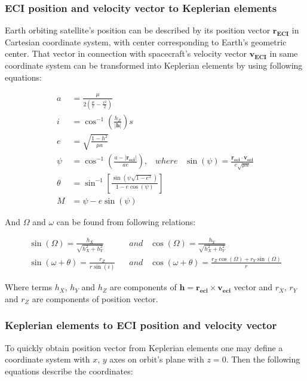     \subsubsection{ECI position and velocity vector to Keplerian elements}
        Earth orbiting satellite's position can be described by its position vector $\textbf{r}_{\textbf{ECI}}$ in Cartesian coordinate system, with center corresponding to Earth's geometric center. That vector in connection with spacecraft's velocity vector $\textbf{v}_{\textbf{ECI}}$ in same coordinate system can be transformed into Keplerian elements by using following equations:
        
        \begin{align}
            a &= \frac{\mu}{2\left(\frac{\mu}{r}-\frac{v^2}{2}\right)} \\
            i &= \cos^{-1}\left(\frac{h_Z}{|\textbf{h}|}\right)s \\
            e &= \sqrt{ \frac{1-h^2}{\mu a} } \\
            \psi &= \cos^{-1}\left(\frac{a-|\textbf{r}_{\textbf{eci}}|}{ae}\right), \;\;\; where \;\;\; \sin(\psi) = \frac{\textbf{r}_{\textbf{eci}}\cdot\textbf{v}_{\textbf{eci}}}{e\sqrt{\mu a}} \\
            \theta &= \sin^{-1}\left[\frac{\sin(\psi \sqrt{1-e^2})}{1-e\cos(\psi)}\right] \\
            M & = \psi - e\sin(\psi)
        \end{align}

        And $\Omega$ and $\omega$ can be found from following relations:

        \begin{align}
            \sin(\Omega) = \frac{h_X}{\sqrt{h^2_X+h^2_Y}}\;\;\; & and\;\;\; \cos(\Omega) = \frac{h_Y}{\sqrt{h^2_X+h^2_Y}} \\
            \sin(\omega+\theta) = \frac{r_Z}{r\sin(i)}\;\;\; & and\;\;\; \cos(\omega+\theta) = \frac{r_Z\cos(\Omega)+r_Y\sin(\Omega)}{r}
        \end{align}

        Where terms $h_X$, $h_Y$ and $h_Z$ are components of $\textbf{h}=\textbf{r}_{\textbf{eci}}\times \textbf{v}_{\textbf{eci}}$ vector and $r_X$, $r_Y$ and $r_Z$ are components of position vector.
    
    \subsubsection{Keplerian elements to ECI position and velocity vector}
        To quickly obtain position vector from Keplerian elements one may define a coordinate system with $x$, $y$ axes on orbit's plane with $z=0$. Then the following equations describe the coordinates:

